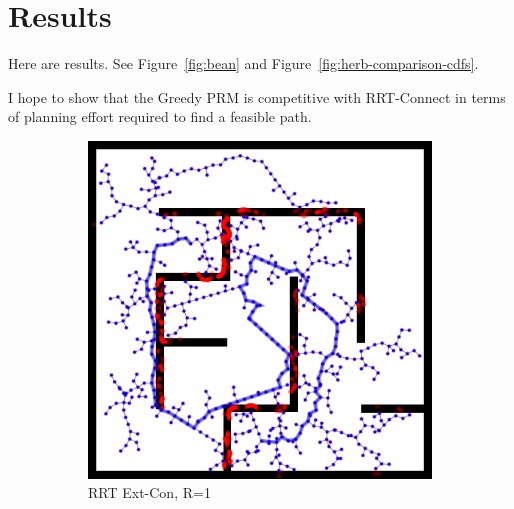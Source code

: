 \documentclass{report}
\begin{document}
\section{Results}

Here are results.
See Figure~\ref{fig:bean} and Figure~\ref{fig:herb-comparison-cdfs}.

I hope to show that the Greedy PRM is competitive with RRT-Connect
in terms of planning effort required to find a feasible path.

\begin{figure}
\centering
\begin{subfigure}[b]{0.3\textwidth}
\includegraphics[width=\textwidth]{figs/compare-2d-rrtc1-rrtextcon-r1-s1.png}
\caption{RRT Ext-Con, R=1}
\end{subfigure}%
\quad
\begin{subfigure}[b]{0.3\textwidth}

\end{subfigure}
\end{figure}
\end{document}
